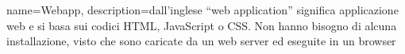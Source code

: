 {
	name={Webapp},
	description={dall'inglese “web application” significa applicazione web e si basa sui codici HTML, JavaScript o CSS. Non hanno bisogno di alcuna installazione, visto che sono caricate da un web server ed eseguite in un browser}
}